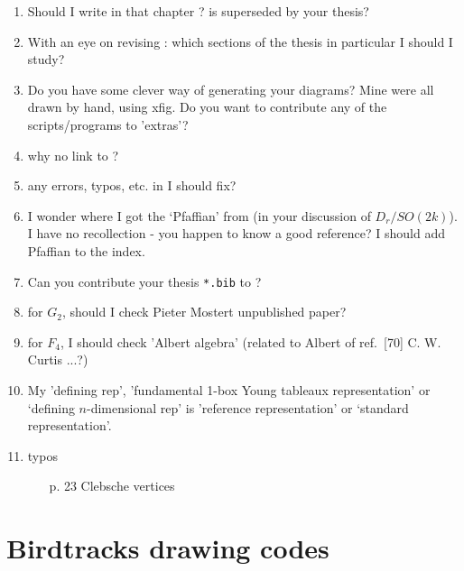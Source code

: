 \begin{enumerate}
  \item
Should I write in {\wwwgt} that chapter ? is superseded by your thesis?
  \item
With an eye on revising {\wwwgt}:
which sections of the thesis in particular I should I study?
  \item
Do you have some clever way of generating your diagrams?
  Mine were all drawn by hand, using xfig.
  Do you want to contribute any of the scripts/programs to {\wwwgt} 'extras'?
  \item
why no link to {\wwwgt}?
  \item
any errors, typos, etc. in {\wwwgt} I should fix?
  \item
I wonder where I got the `Pfaffian' from (in your discussion of $D_r /
SO(2k)$). I have no recollection - you happen to know a good reference?
  I should add Pfaffian to the index.
  \item
Can you contribute your thesis \texttt{*.bib} to {\wwwgt}?
  \item
for $G_2$, should I check Pieter Mostert unpublished paper?
  \item
for $F_4$, I should check 'Albert algebra' (related to
{Albert} of
{\wwwgt} ref.~[70] C. W. Curtis ...?)
  \item
My 'defining rep', 'fundamental 1-box Young tableaux representation'
or `defining $n$-dimensional rep' is 'reference representation'
or `standard representation'.
  \item typos
  \begin{itemize}
    \item[p. 23] Clebsche vertices
  \end{itemize}
\end{enumerate}

\section{Birdtracks drawing codes}
\label{s-code}

